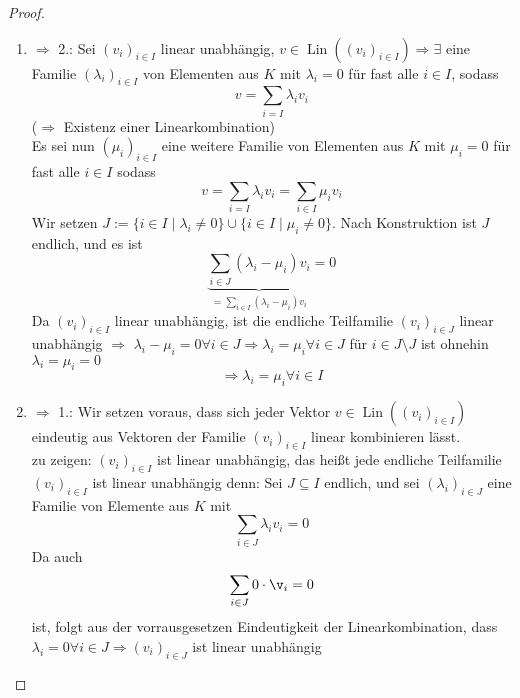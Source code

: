 \documentclass[a4paper]{scrartcl}
\DeclareMathOperator{\Exists}{\exists}
\DeclareMathOperator{\Forall}{\forall}
\DeclareMathOperator{\Lin}{Lin}
\theoremstyle{definition}
\theoremstyle{plain}
\theoremstyle{plain}
\theoremstyle{remark}
\theoremstyle{remark}
\theoremstyle{remark}
\begin{document}
\begin{proof}
\begin{enumerate}
\item $\Rightarrow$ 2.: Sei $(v_i)_{i\in I}$ linear unabhängig, $v\in \Lin((v_i)_{i\in I}) \Rightarrow \Exists$ eine Familie $(\lambda_i)_{i\in I}$ von Elementen aus $K$ mit
$\lambda_i = 0$ für fast alle $i\in I$, sodass
\[v = \sum_{i=I} \lambda_i v_i\]
($\Rightarrow$ Existenz einer Linearkombination) \\
     Es sei nun $(\mu_i)_{i\in I}$ eine weitere Familie von Elementen aus $K$ mit $\mu_i = 0$ für fast alle $i \in I$ sodass
\[v = \sum_{i = I} \lambda_i v_i = \sum_{i\in I} \mu_i v_i\]
Wir setzen $J:= \{i\in I \mid \lambda_i \neq 0\} \cup \{i \in I \mid \mu_i \neq 0\}$. Nach Konstruktion ist $J$ endlich, und es ist
\[\underbrace{\sum_{i\in J} (\lambda_i - \mu_i) v_i}_{=\sum_{i\in I} (\lambda_i - \mu_i) v_i} = 0\]
Da $(v_i)_{i\in I}$ linear unabhängig, ist die endliche Teilfamilie $(v_i)_{i\in J}$ linear unabhängig $\Rightarrow$ $\lambda_i - \mu_i = 0 \Forall i\in J \Rightarrow \lambda_i = \mu_i \Forall i\in J$
für $i\in J\setminus J$ ist ohnehin $\lambda_i = \mu_i = 0$
\[\Rightarrow \lambda_i = \mu_i \Forall i\in I\]
\item $\Rightarrow$ 1.: Wir setzen voraus, dass sich jeder Vektor $v\in\Lin((v_i)_{i\in I})$ eindeutig aus Vektoren der Familie $(v_i)_{i\in I}$ linear kombinieren lässt. \\
     zu zeigen: $(v_i)_{i\in I}$ ist linear unabhängig, das heißt jede endliche Teilfamilie $(v_i)_{i\in I}$ ist linear unabhängig denn:
Sei $J \subseteq I$ endlich, und sei $(\lambda_i)_{i\in J}$ eine Familie von Elemente aus $K$ mit
\[\sum_{i\in J}\lambda_i v_i = 0\]
Da auch
\[\sum_{i\in J} 0 \cdot \v_i = 0\]
ist, folgt aus der vorrausgesetzen Eindeutigkeit der Linearkombination, dass $\lambda_i = 0 \Forall i\in J \Rightarrow (v_i)_{i\in J}$ ist linear unabhängig
\end{enumerate}
\end{proof}
\end{document}
